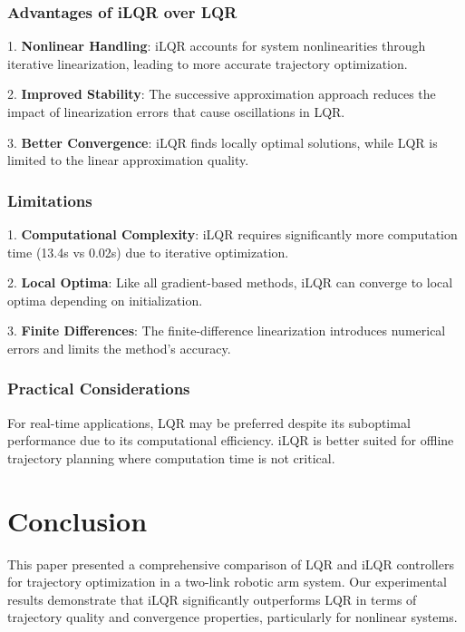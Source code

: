 \documentclass[conference]{IEEEtran}
\begin{document}
\subsubsection{Advantages of iLQR over LQR}

1. \textbf{Nonlinear Handling}: iLQR accounts for system nonlinearities through iterative linearization, leading to more accurate trajectory optimization.

2. \textbf{Improved Stability}: The successive approximation approach reduces the impact of linearization errors that cause oscillations in LQR.

3. \textbf{Better Convergence}: iLQR finds locally optimal solutions, while LQR is limited to the linear approximation quality.

\subsubsection{Limitations}

1. \textbf{Computational Complexity}: iLQR requires significantly more computation time (13.4s vs 0.02s) due to iterative optimization.

2. \textbf{Local Optima}: Like all gradient-based methods, iLQR can converge to local optima depending on initialization.

3. \textbf{Finite Differences}: The finite-difference linearization introduces numerical errors and limits the method's accuracy.

\subsubsection{Practical Considerations}

For real-time applications, LQR may be preferred despite its suboptimal performance due to its computational efficiency. iLQR is better suited for offline trajectory planning where computation time is not critical.

\section{Conclusion}

This paper presented a comprehensive comparison of LQR and iLQR controllers for trajectory optimization in a two-link robotic arm system. Our experimental results demonstrate that iLQR significantly outperforms LQR in terms of trajectory quality and convergence properties, particularly for nonlinear systems.
\end{document}
